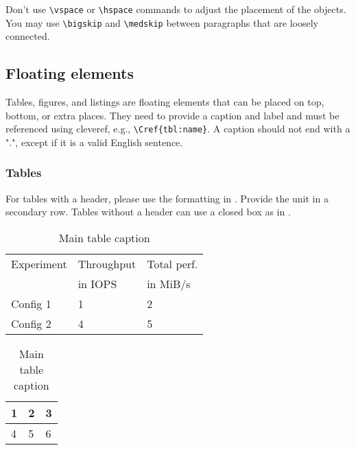 \documentclass{jhps}
\begin{document}
\medskip

Don't use \verb|\vspace| or \verb|\hspace| commands to adjust the placement of the objects.
You may use \verb|\bigskip| and \verb|\medskip| between paragraphs that are loosely connected.

\subsection{Floating elements}
Tables, figures, and listings are floating elements that can be placed on top, bottom, or extra places.
They need to provide a caption and label and must be referenced using cleveref, e.g., \verb|\Cref{tbl:name}|.
A caption should not end with a ".", except if it is a valid English sentence.

\subsubsection{Tables}

For tables with a header, please use the formatting in .
Provide the unit in a secondary row.
Tables without a header can use a closed box as in .

\begin{table}
  \centering
  \begin{subtable}[t]{8cm}
  \centering
  \begin{tabular}{l|l|l}
         \rowcolor{tblhead} Experiment  & Throughput & Total perf.
  \\
         \rowcolor{tblhead}   & in IOPS & in MiB/s \\
       \hline
       \hline
   Config 1 & 1   &  2   \\
  \hline
   Config 2 & 4   &  5   \\
  \end{tabular}
  \caption{Caption 1}\label{tbl:1a}
  \end{subtable}
  \begin{subtable}[t]{3cm}
  \centering
  \begin{tabular}{|l|l|l|}
  \hline
   1   &  2   &  3  \\
  \hline
   4   &  5   &  6  \\
  \hline
  \end{tabular}
  \caption{Caption 2}\label{tbl:1b}
  \end{subtable}
  \caption{Main table caption}\label{tbl:1}
\end{table}
\end{document}

